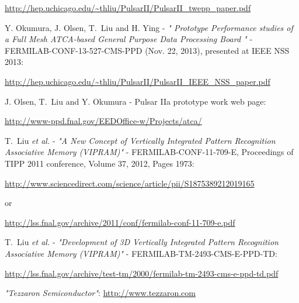 \documentclass[10pt,a4paper]{article}
\begin{document}
\begin{thebibliography}{99}
\url{http://hep.uchicago.edu/~thliu/PulsarII/PulsarII_twepp_paper.pdf}

 Y. Okumura, J. Olsen, T.~Liu and H. Ying - {\it "
Prototype Performance studies of a Full Mesh ATCA-based General Purpose Data Processing Board
"} - FERMILAB-CONF-13-527-CMS-PPD (Nov. 22, 2013), presented at IEEE NSS 2013: 

\url{http://hep.uchicago.edu/~thliu/PulsarII/PulsarII_IEEE_NSS_paper.pdf}

 J. Olsen, T.~Liu and Y. Okumura - 
Pulsar IIa prototype work web page:

\url{http://www-ppd.fnal.gov/EEDOffice-w/Projects/atca/}

 T.~Liu {\it et al.} - {\it "A New Concept of Vertically Integrated Pattern Recognition Associative Memory (VIPRAM)"} - FERMILAB-CONF-11-709-E, Proceedings of TIPP 2011 conference, Volume 37, 2012, Pages 1973: 

\url{http://www.sciencedirect.com/science/article/pii/S1875389212019165}

or 

\url{http://lss.fnal.gov/archive/2011/conf/fermilab-conf-11-709-e.pdf}

 T.~Liu {\it et al.} - {\it "Development of 3D Vertically Integrated Pattern Recognition Associative Memory (VIPRAM)"} - FERMILAB-TM-2493-CMS-E-PPD-TD:

\url{http://lss.fnal.gov/archive/test-tm/2000/fermilab-tm-2493-cms-e-ppd-td.pdf}






 {\it "Tezzaron Semiconductor"}:
\url{http://www.tezzaron.com}







\end{thebibliography}
\end{document}
